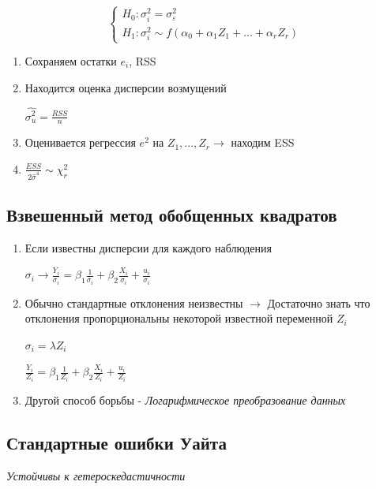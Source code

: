 \documentclass[a4paper, 12pt]{article}
\begin{document}
\[\begin{cases}
    H_{0}: \sigma_{i}^{2} = \sigma_{\varepsilon}^{2} \\
    H_{1}: \sigma_{i}^{2} \sim f(\alpha_{0} + \alpha_{1}Z_{1} + ... + \alpha_{r}Z_{r})
\end{cases}\]

\begin{enumerate}
    \item Сохраняем остатки $e_{i}$, RSS
    \item Находится оценка дисперсии возмущений
    
    $\hat{\sigma_{u}^{2}} = \frac{RSS}{n}$
    \item Оценивается регрессия $e^{2}$ на $Z_{1}, ..., Z_{r} \rightarrow$ находим ESS
    \item $\frac{ESS}{2\hat{\sigma}^{4}} \sim \chi^{2}_{r}$
\end{enumerate}

\subsection{Взвешенный метод обобщенных квадратов}

\begin{enumerate}
    \item Если известны дисперсии для каждого наблюдения 
    
    $\sigma_{i} \rightarrow \frac{Y_{i}}{\sigma_{i}} = \beta_{1}\frac{1}{\sigma_{i}} + \beta_{2}\frac{X_{i}}{\sigma_{i}} + \frac{u_{i}}{\sigma_{i}}$ 
    
    \item Обычно стандартные отклонения неизвестны $\rightarrow$ Достаточно знать что отклонения пропорциональны некоторой известной переменной $Z_{i}$
    
    $\sigma_{i} = \lambda Z_{i}$
    
    $\frac{Y_{i}}{Z_{i}} = \beta_{1}\frac{1}{Z_{i}} + \beta_{2}\frac{X_{i}}{Z_{i}} + \frac{u_{i}}{Z_{i}}$
    
    \item Другой способ борьбы - \textit{Логарифмическое преобразование данных}
\end{enumerate}

\subsection{Стандартные ошибки Уайта}

\begin{center}
    \textit{Устойчивы к гетероскедастичности}
\end{center}
\end{document}
